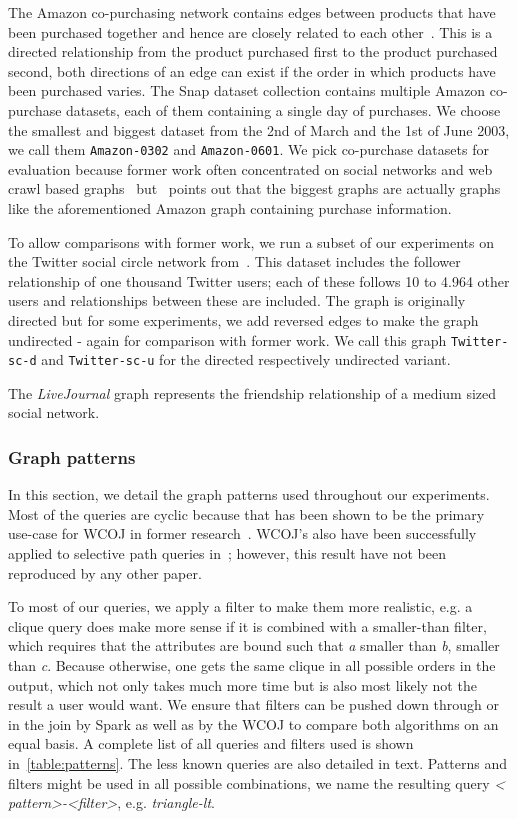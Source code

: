 The Amazon co-purchasing network contains edges between products that have been purchased together and hence are closely related to each other~\cite{snapnets}.
This is a directed relationship from the product purchased first to the product purchased second, both directions of an edge can exist if the order in which
products have been purchased varies.
The Snap dataset collection contains multiple Amazon co-purchase datasets, each of them containing a single day of purchases.
We choose the smallest and biggest dataset from the 2nd of March and the 1st of June 2003, we call them \texttt{Amazon-0302} and
\texttt{Amazon-0601}.
We pick co-purchase datasets for evaluation because former work often concentrated on social networks and web crawl based
graphs~\cite{myria-detailed,ammar2018distributed} but~\cite{salihoglu2018} points out that the biggest graphs are actually graphs like
the aforementioned Amazon graph containing purchase information.

To allow comparisons with former work, we run a subset of our experiments on the Twitter social circle network from~\cite{snapnets}.
This dataset includes the follower relationship of one thousand Twitter users; each of these follows 10 to 4.964 other users and
relationships between these are included.
The graph is originally directed but for some experiments, we add reversed edges to make the graph undirected - again for comparison with former work.
We call this graph \texttt{Twitter-sc-d} and \texttt{Twitter-sc-u} for the directed respectively undirected variant.

The \textit{LiveJournal} graph represents the friendship relationship of a medium sized social network.

\subsubsection{Graph patterns}

In this section, we detail the graph patterns used throughout our experiments.
Most of the queries are cyclic because that has been shown to be the primary use-case for WCOJ in former research~\cite{olddog,myria-detailed}.
WCOJ's also have been successfully applied to selective path queries in~\cite{olddog}; however, this result have not been reproduced by any
other paper.

To most of our queries, we apply a filter to make them more realistic, e.g. a clique query does make more sense if it is combined with a
smaller-than filter, which requires that the attributes are bound such that \textit{a} smaller than \textit{b}, smaller than \textit{c}.
Because otherwise, one gets the same clique in all possible orders in the output, which not only takes much more time but is also most
likely not the result a user would want.
We ensure that filters can be pushed down through or in the join by Spark as well as by the WCOJ to compare both algorithms on an equal basis.
A complete list of all queries and filters used is shown in~\cref{table:patterns}.
The less known queries are also detailed in text.
Patterns and filters might be used in all possible combinations, we name the resulting query \textit{\textless
pattern\textgreater-\textless filter\textgreater}, e.g. \textit{triangle-lt}.

